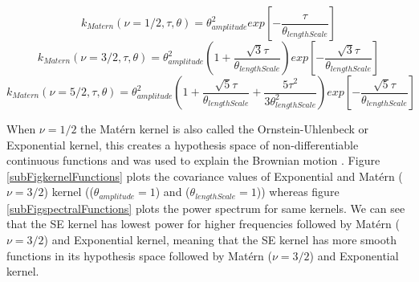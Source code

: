\begin{equation}\label{eqnExponential}
k_{Matern}(\nu = 1/2, \tau, \theta) = \theta_{amplitude}^2exp[-\frac{\tau}{\theta_{lengthScale}}]
\end{equation}
\begin{equation}\label{eqnMAT32}
k_{Matern}(\nu = 3/2, \tau, \theta) = \theta_{amplitude}^2 (1 + \frac{\sqrt{3}\tau}{\theta_{lengthScale}}) exp[-\frac{\sqrt{3}\tau}{\theta_{lengthScale}}]
\end{equation}
\begin{equation}\label{eqnMAT52}
k_{Matern}(\nu = 5/2, \tau, \theta) = \theta_{amplitude}^2(1 + \frac{\sqrt{5}\tau}{\theta_{lengthScale}} + \frac{5\tau^2}{3\theta_{lengthScale}^2})
exp[-\frac{\sqrt{5}\tau}{\theta_{lengthScale}}]
\end{equation}

When $\nu = 1/2$ the Mat\'ern kernel is also called the Ornstein-Uhlenbeck or Exponential kernel, this creates a hypothesis space of non-differentiable continuous functions and was used to explain the Brownian motion \cite{uhlenbeck1930theory}. Figure \ref{subFigkernelFunctions} plots the covariance values of Exponential and Mat\'ern ($\nu=3/2$) kernel (($\theta_{amplitude} = 1$) and ($\theta_{lengthScale} = 1$)) whereas figure \ref{subFigspectralFunctions} plots the power spectrum for same kernels. We can see that the SE kernel has lowest power for higher frequencies followed by Mat\'ern ($\nu=3/2$) and Exponential kernel, meaning that the SE kernel has more smooth functions in its hypothesis space followed by Mat\'ern ($\nu=3/2$) and Exponential kernel. 

